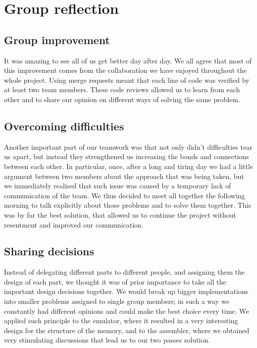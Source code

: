 \documentclass[11pt]{article}
\begin{document}
\section{Group reflection}
 
\subsection{Group improvement}
It was amazing to see all of us get better day after day. We all agree that most of this improvement comes from the collaboration we have enjoyed throughout the whole project. Using merge requests meant that each line of code was verified by at least two team members. These code reviews allowed us to learn from each other and to share our opinion on different ways of solving the same problem.

\subsection{Overcoming difficulties}
Another important part of our teamwork was that not only didn't difficulties tear us apart, but instead they strengthened us increasing the bonds and connections between each other. In particular, once, after a long and tiring day we had a little argument between two members about the approach that was being taken, but we immediately realised that such issue was caused by a temporary lack of communication of the team. We thus decided to meet all together the following morning to talk explicitly about those problems and to solve them together. This was by far the best solution, that allowed us to continue the project without resentment and improved our communication. 

\subsection{Sharing decisions}
Instead of delegating different parts to different people, and assigning them the design of each part, we thought it was of prior importance to take all the important design decisions together. We would break up bigger implementations into smaller problems assigned to single group members; in such a way we constantly had different opinions and could make the best choice every time. We applied such principle to the emulator, where it resulted in a very interesting design for the structure of the memory, and to the assembler, where we obtained very stimulating discussions that lead us to our two passes solution.
\end{document}
